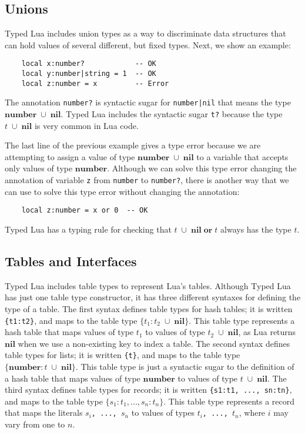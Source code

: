 \documentclass[preprint]{sig-alternate}
\newcommand{\Nil}{\mathbf{nil}}
\newcommand{\Number}{\mathbf{number}}
\begin{document}
\subsection{Unions}

Typed Lua includes union types as a way to discriminate data
structures that can hold values of several different, but fixed types.
Next, we show an example:
\begin{verbatim}
    local x:number?            -- OK
    local y:number|string = 1  -- OK
    local z:number = x         -- Error
\end{verbatim}

The annotation \texttt{number?} is syntactic sugar for
\texttt{number|nil} that means the type $\Number\;\cup\;\Nil$.
Typed Lua includes the syntactic sugar \texttt{t?} because the
type $t\;\cup\;\Nil$ is very common in Lua code.

The last line of the previous example gives a type error because we
are attempting to assign a value of type $\Number\;\cup\;\Nil$
to a variable that accepts only values of type $\Number$.
Although we can solve this type error changing the annotation of
variable \texttt{z} from \texttt{number} to \texttt{number?}, there is
another way that we can use to solve this type error without changing
the annotation:
\begin{verbatim}
    local z:number = x or 0  -- OK
\end{verbatim}

Typed Lua has a typing rule for checking that
$t\;\cup\;\Nil\;\mathbf{or}\;t$ always has the type $t$.

\subsection{Tables and Interfaces}

Typed Lua includes table types to represent Lua's tables.
Although Typed Lua has just one table type constructor, it has three
different syntaxes for defining the type of a table.
The first syntax defines table types for hash tables;
it is written \texttt{\{t1:t2\}},
and maps to the table type $\{t_{1}:t_{2}\;\cup\;\Nil\}$.
This table type represents a hash table that maps values of type
$t_{1}$ to values of type $t_{2}\;\cup\;\Nil$, as Lua returns
$\Nil$ when we use a non-existing key to index a table.
The second syntax defines table types for lists;
it is written \texttt{\{t\}},
and maps to the table type $\{\Number:t\;\cup\;\Nil\}$.
This table type is just a syntactic sugar to the definition of a
hash table that maps values of type $\Number$ to values of type
$t\;\cup\;\Nil$.
The third syntax defines table types for records;
it is written \texttt{\{s1:t1, ..., sn:tn\}},
and maps to the table type $\{s_{1}:t_{1}, ..., s_{n}:t_{n}\}$.
This table type represents a record that maps the literals
$s_{i}$\texttt{, ..., }$s_{n}$ to values of types
$t_{i}$\texttt{, ..., }$t_{n}$, where $i$ may vary from one to $n$.
\end{document}
